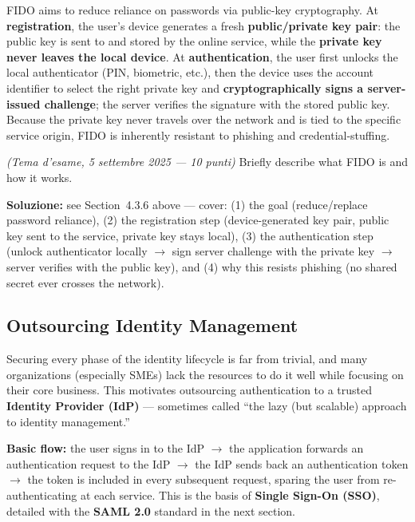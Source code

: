 \documentclass[12pt, a4paper]{article}
\newcounter{esercizio}[section]
\begin{document}
FIDO aims to reduce reliance on passwords via public-key cryptography. At \textbf{registration}, the user's device generates a fresh \textbf{public/private key pair}: the public key is sent to and stored by the online service, while the \textbf{private key never leaves the local device}. At \textbf{authentication}, the user first unlocks the local authenticator (PIN, biometric, etc.), then the device uses the account identifier to select the right private key and \textbf{cryptographically signs a server-issued challenge}; the server verifies the signature with the stored public key. Because the private key never travels over the network and is tied to the specific service origin, FIDO is inherently resistant to phishing and credential-stuffing.

\begin{tcolorbox}[colback=lightergray!10, colframe=tocsec, title=\textbf{Esercizio \theesercizio}]
\textit{(Tema d'esame, 5 settembre 2025 — 10 punti)} Briefly describe what FIDO is and how it works.
\end{tcolorbox}

\textbf{Soluzione:} see Section~4.3.6 above — cover: (1) the goal (reduce/replace password reliance), (2) the registration step (device-generated key pair, public key sent to the service, private key stays local), (3) the authentication step (unlock authenticator locally $\rightarrow$ sign server challenge with the private key $\rightarrow$ server verifies with the public key), and (4) why this resists phishing (no shared secret ever crosses the network).

\subsection{Outsourcing Identity Management}

Securing every phase of the identity lifecycle is far from trivial, and many organizations (especially SMEs) lack the resources to do it well while focusing on their core business. This motivates outsourcing authentication to a trusted \textbf{Identity Provider (IdP)} — sometimes called ``the lazy (but scalable) approach to identity management.''

\textbf{Basic flow:} the user signs in to the IdP $\rightarrow$ the application forwards an authentication request to the IdP $\rightarrow$ the IdP sends back an authentication token $\rightarrow$ the token is included in every subsequent request, sparing the user from re-authenticating at each service. This is the basis of \textbf{Single Sign-On (SSO)}, detailed with the \textbf{SAML 2.0} standard in the next section.
\end{document}
